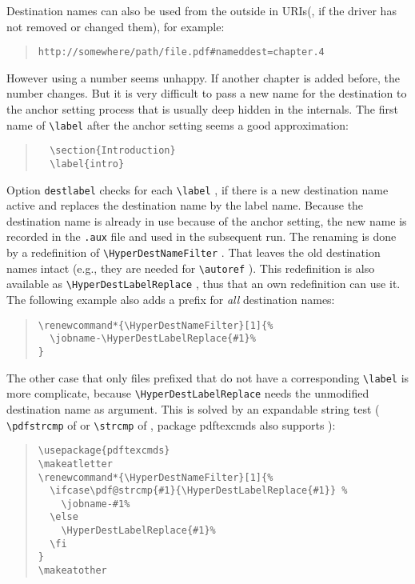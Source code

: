\documentclass[pdftex]{article}
\newcommand*{\cs}[1]{%
  \texttt{\textbackslash #1}%
}
\newcommand*{\xpackage}[1]{\textsf{#1}}
\begin{document}
Destination names can also be used from the outside in URIs(, if the
driver has not removed or changed them), for example:
\begin{quote}
\begin{verbatim}
http://somewhere/path/file.pdf#nameddest=chapter.4
\end{verbatim}
\end{quote}
However using a number seems unhappy. If another chapter is added
before, the number changes. But it is very difficult to pass
a new name for the destination to the anchor setting process that
is usually deep hidden in the internals. The first name of
\cs{label} after the anchor setting seems a good approximation:
\begin{quote}
\begin{verbatim}
  \section{Introduction}
  \label{intro}
\end{verbatim}
\end{quote}
Option \texttt{destlabel} checks for each \cs{label}, if there is
a new destination name active and replaces the destination
name by the label name. Because the destination name is already in use
because of the anchor setting, the new name is recorded in the \texttt{.aux}
file and used in the subsequent  run. The renaming is done by
a redefinition of \cs{HyperDestNameFilter}. That leaves the old
destination names intact (e.g., they are needed for \cs{autoref}).
This redefinition is also available as \cs{HyperDestLabelReplace},
thus that an own redefinition can use it.
The following example also adds a prefix for \emph{all} destination names:
\begin{quote}
\begin{verbatim}
\renewcommand*{\HyperDestNameFilter}[1]{%
  \jobname-\HyperDestLabelReplace{#1}%
}
\end{verbatim}
\end{quote}
The other case that only files prefixed that do not have a corresponding
\cs{label} is more complicate, because \cs{HyperDestLabelReplace} needs
the unmodified destination name as argument. This is solved by an
expandable string test (\cs{pdfstrcmp} of 
or \cs{strcmp} of , package \xpackage{pdftexcmds} also supports
):
\begin{quote}
\begin{verbatim}
\usepackage{pdftexcmds}
\makeatletter
\renewcommand*{\HyperDestNameFilter}[1]{%
  \ifcase\pdf@strcmp{#1}{\HyperDestLabelReplace{#1}} %
    \jobname-#1%
  \else
    \HyperDestLabelReplace{#1}%
  \fi
}
\makeatother
\end{verbatim}
\end{quote}
\end{document}

